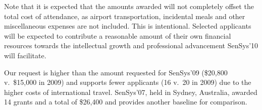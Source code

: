 Note that it is expected that the amounts awarded will not completely offset
the total cost of attendance, as airport transportation, incidental meals and
other miscellaneous expenses are not included. This is intentional. Selected
applicants will be expected to contribute a reasonable amount of their own
financial resources towards the intellectual growth and professional
advancement SenSys'10 will facilitate.

Our request is higher than the amount requested for SenSys'09 (\$20,800
v.~\$15,000 in 2009) and supports fewer applicants (16 v.~20 in 2009) due to
the higher costs of international travel. SenSys'07, held in Sydney,
Australia, awarded 14 grants and a total of \$26,400 and provides another
baseline for comparison.
